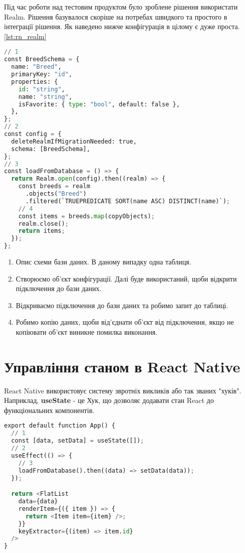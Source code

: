 Під час роботи над тестовим продуктом було зроблене рішення використати Realm.
Рішення базувалося скоріше на потребах швидкого та простого в інтеграції рішення.
Як наведено нижче конфігурація в цілому є дуже проста. \ref{lst:rn_realm}

\begin{lstlisting}[style=light, language=Python,label={lst:rn_realm},caption=React Native Realm]
// 1
const BreedSchema = {
  name: "Breed",
  primaryKey: "id",
  properties: {
    id: "string",
    name: "string",
    isFavorite: { type: "bool", default: false },
  },
};
// 2
const config = {
  deleteRealmIfMigrationNeeded: true,
  schema: [BreedSchema],
};
// 3
const loadFromDatabase = () => {
  return Realm.open(config).then((realm) => {
    const breeds = realm
      .objects("Breed")
      .filtered(`TRUEPREDICATE SORT(name ASC) DISTINCT(name)`);
    // 4
    const items = breeds.map(copyObjects);
    realm.close();
    return items;
  });
};
\end{lstlisting}

\begin{enumerate}
    \item Опис схеми бази даних. В даному випадку одна таблиця.
    \item Створюємо об'єкт конфігурації. Далі буде використаний, щоби відкрити підключення до бази даних.
    \item Відкриваємо підключення до бази даних та робимо запит до таблиці.
    \item Робимо копію даних, щоби від'єднати об'єкт від підключення, якщо не копіювати об'єкт виникне помилка виконання.
\end{enumerate}


\section{Управління станом в React Native}
\label{section.2.8}
React Native використовує систему звротніх викликів або так званих "хуків".
Наприклад, \textbf{useState} - це Хук, що дозволяє додавати стан React до функціональних компонентів.

\begin{lstlisting}[style=light, language=Python,label={lst:rn_state_hooks},caption=React Native Hooks]
export default function App() {
  // 1
  const [data, setData] = useState([]);
  // 2
  useEffect(() => {
    // 3
    loadFromDatabase().then((data) => setData(data));
  });

  return <FlatList
    data={data}
    renderItem={({ item }) => {
      return <Item item={item} />;
    }}
    keyExtractor={(item) => item.id}
  />
}
\end{lstlisting}

